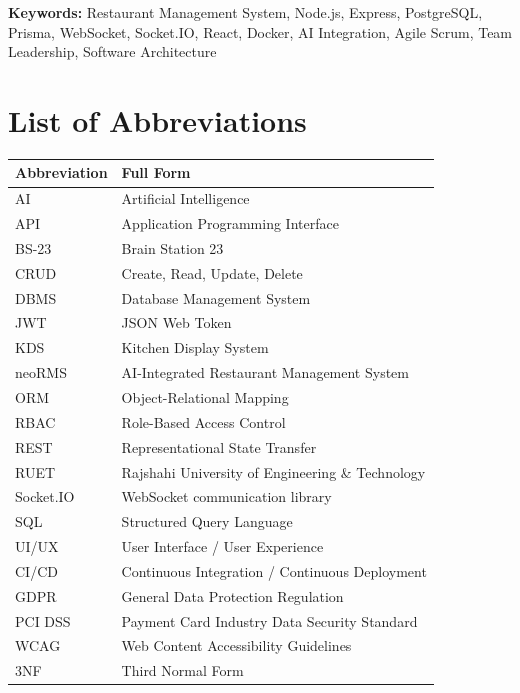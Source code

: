 \documentclass[12pt,a4paper,oneside]{report}
\begin{document}
\vspace{1em}
\noindent\textbf{Keywords:} Restaurant Management System, Node.js, Express, PostgreSQL, Prisma, WebSocket, Socket.IO, React, Docker, AI Integration, Agile Scrum, Team Leadership, Software Architecture

\clearpage

\tableofcontents
\clearpage
\listoffigures
{}
\clearpage
\listoftables
{}
\clearpage

\chapter*{List of Abbreviations}
\begin{tabular}{@{}p{}p{}@{}}
\toprule
\textbf{Abbreviation} & \textbf{Full Form} \\
\midrule
AI & Artificial Intelligence \\
API & Application Programming Interface \\
BS-23 & Brain Station 23 \\
CRUD & Create, Read, Update, Delete \\
DBMS & Database Management System \\
JWT & JSON Web Token \\
KDS & Kitchen Display System \\
neoRMS & AI-Integrated Restaurant Management System \\
ORM & Object-Relational Mapping \\
RBAC & Role-Based Access Control \\
REST & Representational State Transfer \\
RUET & Rajshahi University of Engineering \& Technology \\
Socket.IO & WebSocket communication library \\
SQL & Structured Query Language \\
UI/UX & User Interface / User Experience \\
CI/CD & Continuous Integration / Continuous Deployment \\
GDPR & General Data Protection Regulation \\
PCI DSS & Payment Card Industry Data Security Standard \\
WCAG & Web Content Accessibility Guidelines \\
3NF & Third Normal Form \\
\bottomrule
\end{tabular}
\end{document}
